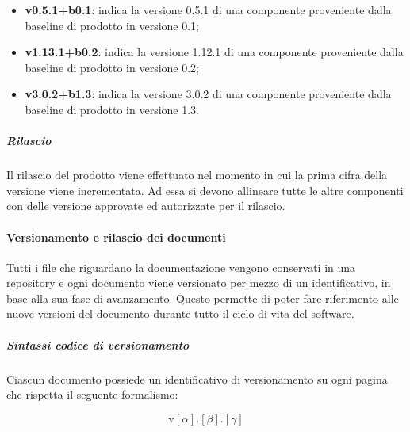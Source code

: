 		\begin{itemize}
			\item \textbf{v0.5.1+b0.1}: indica la versione 0.5.1 di una componente proveniente dalla baseline di prodotto in versione 0.1;
			\item \textbf{v1.13.1+b0.2}:  indica la versione 1.12.1 di una componente proveniente dalla baseline di prodotto in versione 0.2;
			\item \textbf{v3.0.2+b1.3}: indica la versione 3.0.2 di una componente proveniente dalla baseline di prodotto in versione 1.3.
		\end{itemize}

		\subparagraph{Rilascio}

		Il rilascio del prodotto viene effettuato nel momento in cui la prima cifra della versione viene incrementata. Ad essa si devono allineare tutte le altre componenti con delle versione approvate ed autorizzate per il rilascio. 

	\paragraph{Versionamento e rilascio dei documenti}

	Tutti i file che riguardano la documentazione vengono conservati in una repository e ogni documento viene versionato per mezzo di un identificativo, in base alla sua fase di avanzamento. Questo permette di poter fare riferimento alle nuove versioni del documento durante tutto il ciclo di vita del software.

		\subparagraph{Sintassi codice di versionamento}

		Ciascun documento possiede un identificativo di versionamento su ogni pagina che rispetta il seguente formalismo:

		\[%
			\text{v}[\alpha].[\beta].[\gamma]
		\]

